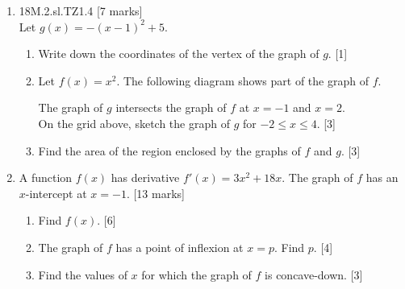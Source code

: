 \documentclass[12pt, twoside]{article}
\begin{document}
\begin{enumerate}
    \item 18M.2.sl.TZ1.4 \hfill [7 marks]\\
    Let  $g(x)=-(x-1)^2+5$.
    \begin{enumerate}
      \item Write down the coordinates of the vertex of the graph of $g$. \hfill [1]
      \item Let $f(x)=x^2$. The following diagram shows part of the graph of $f$.
        \begin{center}
        \end{center}
      The graph of $g$ intersects the graph of $f$ at $x=-1$ and $x=2$.\\
      On the grid above, sketch the graph of $g$ for $-2 \leq x \leq 4$. \hfill [3]
      \item Find the area of the region enclosed by the graphs of $f$ and $g$. \hfill [3]
    \end{enumerate} \vspace{1.5cm}

    \item A function $f(x)$ has derivative $f'(x) = 3x^2 + 18x$. The graph of $f$ has an $x$-intercept at $x = -1$. \hfill [13 marks]
    \begin{enumerate}
      \item Find $f(x)$. \hfill [6]
      \item The graph of $f$ has a point of inflexion at $x = p$. Find $p$. \hfill [4]
      \item Find the values of $x$ for which the graph of $f$ is concave-down. \hfill [3]
    \end{enumerate}


\end{enumerate}
\end{document}
